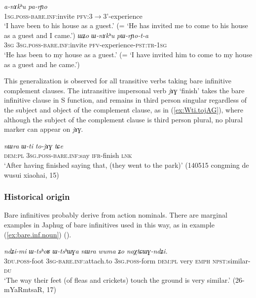 \documentclass[oneside,a4paper,11pt]{article}
\newcommand{\ipa}[1]{\textit{\phon#1}}
\newcommand{\jpg}[2]{\ipa{#1} `#2'}
\newcommand{\refb}[1]{(\ref{#1})}
\begin{document}
\begin{exe}
\ex  \label{ex:nAkhu1}
\gll \ipa{a-nɤkʰu} 	\ipa{pa-rɲo} \\
\textsc{1sg.poss-bare.inf:}invite \textsc{pfv:3$\rightarrow$3'}-experience \\
\glt `I have been to his house as a guest.' (= `He has invited me to come to his house as a guest and I came.')
\ex  \label{ex:nAkhu2}
\gll \ipa{ɯʑo} 	\ipa{ɯ-nɤkʰu} 	\ipa{pɯ-rɲo-t-a} \\
\textsc{3sg}  \textsc{3sg.poss-bare.inf:}invite \textsc{pfv}-experience-\textsc{pst:tr-1sg} \\
\glt `He has been to my house as a guest.' (= `I have invited him to come to my house as a guest and he came.')
\end{exe}

This generalization is observed for all transitive verbs taking bare infinitive complement clauses. The intransitive impersonal verb \jpg{jɤɣ}{finish} takes the bare infinitive clause in S function, and remains in third person singular regardless of the subject and object of the complement clause, as in (\ref{ex:Wti.tojAG}), where although the subject of the complement clause is third person plural, no plural marker can appear on \ipa{jɤɣ}.

\begin{exe}
\ex \label{ex:Wti.tojAG}
\gll \ipa{nɯra} 	\ipa{ɯ-ti} 	\ipa{to-jɤɣ} \ipa{tɕe} \\
\textsc{dem:pl} \textsc{3sg.poss-bare.inf}:say \textsc{ifr}-finish \textsc{lnk}\\
\glt `After having finished saying that, (they went to the park)' (140515 congming de wusui xiaohai, 15)
\end{exe}

\subsubsection{Historical origin} \label{sec:bare.tW.inf.origin}
Bare infinitives probably derive from action nominals. There are marginal examples in Japhug of bare infinitives used in this way, as in example \refb{ex:bare.inf.noun}  (\citealt{jacques14antipassive}).

\begin{exe}
\ex \label{ex:bare.inf.noun}
\gll \ipa{ndʑi-mi}   	\ipa{ɯ-tsʰoʁ}   	\ipa{ɯ-tsʰɯɣa}   	\ipa{nɯra}   	\ipa{wuma}   	\ipa{ʑo}   	\ipa{naχtɕɯɣ-ndʑi.}   \\
\textsc{3du.poss}-foot \textsc{3sg}-\textsc{bare.inf:}attach.to \textsc{3sg.poss}-form \textsc{dem:pl} very \textsc{emph}  \textsc{npst}:similar-\textsc{du}  \\
\glt `The way their feet (of fleas and crickets) touch the ground is very similar.' (26-mYaRmtsaR, 17)
\end{exe}
\end{document}
